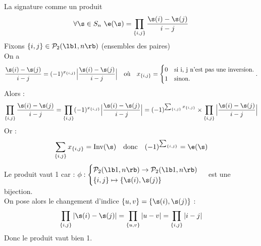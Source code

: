 \documentclass[11pt]{article}
\begin{document}
\begin{prop}{La signature comme un produit}{}
    \begin{equation*}
        \forall  \s \in S_{n} ~ \e(\s) = \prod_{\{i, j\}} \frac{\s(i) - \s(j) }{i - j}
    \end{equation*}
    \tcblower
    Fixons $\{i, j \} \in \mathcal{P}_{2}(\lb 1, n \rb)$ (ensembles des paires)\\
    On a 
    \begin{equation*}
        \frac{\s(i) - \s(j) }{i - j} = (-1)^{x_{\{i, j \}}} \Big|\frac{\s(i) - \s(j) }{i - j}\Big| \quad \text{où} \quad x_{\{i, j \}} = 
        \begin{cases}
            0 & \mbox{si {i, j} n'est pas une inversion.} \\
            1 & \mbox{sinon.}
        \end{cases}.
    \end{equation*}
    Alors :
    \begin{equation*}
        \prod_{\{i, j\}} \frac{\s(i) - \s(j) }{i - j} = \prod_{\{i, j\}} (-1)^{x_{\{i, j \}}} \Big|\frac{\s(i) - \s(j) }{i - j}\Big| = (-1)^{\sum_{\{i, j \}} x_{\{i, j \}}} \times \prod_{\{i, j\}} \Big|\frac{\s(i) - \s(j) }{i - j}\Big|
    \end{equation*}
    Or :
    \begin{equation*}
        \sum_{\{i, j \}} x_{\{i, j \}} = \text{Inv}(\s) \quad \text{donc} \quad (-1)^{\sum_{\{i, j \}}} = \e(\s)
    \end{equation*}
    Le produit vaut 1 car :
    $\phi : \begin{cases}
        \mathcal{P}_{2}(\lb 1, n \rb) \to \mathcal{P}_{2}(\lb 1, n \rb) \\
        \{ i, j \} \mapsto \{ \s(i), \s(j) \}
    \end{cases}$ est une bijection.\\
    On pose alors le changement d'indice $\{ u, v \} = \{ \s(i), \s(j) \}$ :
    \begin{equation*}
        \prod_{\{i, j\}} |\s(i) - \s(j)| = \prod_{\{u, v\}} |u - v| = \prod_{\{i, j\}} |i - j|
    \end{equation*}
    Donc le produit vaut bien 1.
\end{prop}

\vspace*{0.4cm}
\end{document}
